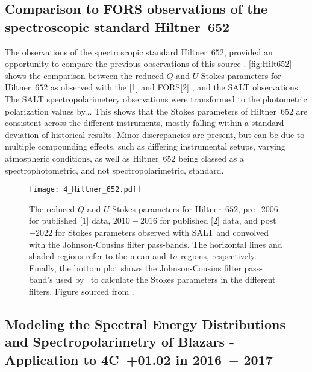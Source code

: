 \subsection{Comparison to FORS observations of the  spectroscopic standard Hiltner~652}

The observations of the spectroscopic standard Hiltner~$652$, provided an opportunity to compare the 
previous observations of this source \citep[presented in part in][]{Cooper_HEASA2022}.  \autoref{fig:Hilt652} shows the comparison between the reduced $Q$ and $U$ Stokes parameters for Hiltner~$652$ as observed with the %
[1] and \gls{FORS}[2] \citep[as reported by][]{FORS1, FORS2}, and the \gls{SALT} observations.  The SALT spectropolarimetery observations were transformed to the photometric polarization values by...
This shows that the Stokes parameters of Hiltner~$652$ are consistent across the different instruments, mostly falling within a standard deviation of historical results.
Minor discrepancies are present, but can be due to multiple compounding effects, such as differing instrumental setups, varying atmospheric conditions, as well as Hiltner~$652$ being classed as a spectrophotometric, and not spectropolarimetric, standard.

\begin{figure}[t]
    \centering
    \texttt{[image: 4\_Hiltner\_652.pdf]}
    \caption{The reduced $Q$ and $U$ Stokes parameters for Hiltner~$652$, pre$-2006$ for published [1] data, $2010 - 2016$ for published [2] data, and post$-2022$ for Stokes parameters observed with \gls{SALT} and convolved with the Johnson-Cousins filter pass-bands. The horizontal lines and shaded regions refer to the  mean and $1\sigma$ regions, respectively. Finally, the bottom plot shows the Johnson-Cousins filter pass-band’s used by \polsalt\ to calculate the Stokes parameters in the different filters. Figure sourced from \citep{Cooper_HEASA2022}.}
    \label{fig:Hilt652}
\end{figure}



\subsection[Schutte et al.\ (2022)]{%
    Modeling the Spectral Energy Distributions and Spectro\-polari\-metry of Blazars - Application to 4C~+01.02 in 2016~$-$ 2017\\
    \citep{Schutte4C0102}
}

